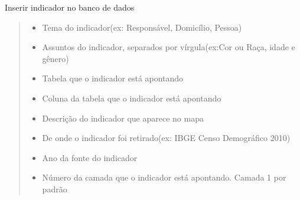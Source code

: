 \documentclass[letterpaper,10pt,brazil]{sphinxmanual}
\begin{document}
\begin{fulllineitems}
\begin{fulllineitems}
\label{\detokenize{api_gen/apiModulo.api_insercao:apiModulo.api_insercao.ApiIns.inserirIndicador}}
\pysigstartsignatures
{}
\pysigstopsignatures
\sphinxAtStartPar
Inserir indicador no banco de dados
\begin{quote}\begin{description}
\begin{itemize}
\item {} 
\sphinxAtStartPar
{} \textendash{} Tema do indicador(ex: Responsável, Domicílio, Pessoa)

\item {} 
\sphinxAtStartPar
{} \textendash{} Assuntos do indicador, separados por vírgula(ex:Cor ou Raça, idade e gênero)

\item {} 
\sphinxAtStartPar
{} \textendash{} Tabela que o indicador está apontando

\item {} 
\sphinxAtStartPar
{} \textendash{} Coluna da tabela que o indicador está apontando

\item {} 
\sphinxAtStartPar
{} \textendash{} Descrição do indicador que aparece no mapa

\item {} 
\sphinxAtStartPar
{} \textendash{} De onde o indicador foi retirado(ex: IBGE Censo Demográfico 2010)

\item {} 
\sphinxAtStartPar
{} \textendash{} Ano da fonte do indicador

\item {} 
\sphinxAtStartPar
{} \textendash{} Número da camada que o indicador está apontando. Camada 1 por padrão


\end{itemize}
\end{description}
\end{quote}
\end{fulllineitems}
\end{fulllineitems}
\end{document}
